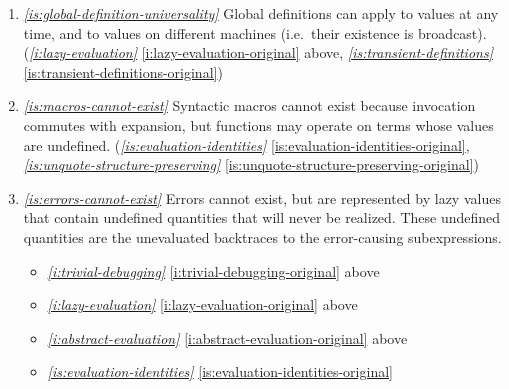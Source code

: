 \documentclass{report}
\makeatletter
\newcommand*{\Label}[2]{%
  \@bsphack
  \begingroup
    \label{#1-original}%
    \def\@currentlabel{#2}%
    \label{#1}%
  \endgroup
  \@esphack
}
\newcommand{\refboth}[1]{{\em \ref{#1}} \ref{#1-original}}
\makeatother
\begin{document}
\begin{enumerate}
\begin{itemize}
\item \refboth{i:distributed-computation} above
\item \refboth{i:no-oome} above
\item \refboth{i:lazy-evaluation} above
\item \refboth{is:runtime-as-receiver}
\end{itemize}
\item{}\Label{is:global-definition-universality}{xhs.globaldefs}{\em\ref{is:global-definition-universality}}
  Global definitions can apply to values at any time, and to values on
  different machines (i.e.~their existence is broadcast).
(\refboth{i:lazy-evaluation} above, \refboth{is:transient-definitions})

\item{}\Label{is:macros-cannot-exist}{xhs.nomacros}{\em\ref{is:macros-cannot-exist}}
  Syntactic macros cannot exist because invocation commutes with expansion,
  but functions may operate on terms whose values are undefined.
(\refboth{is:evaluation-identities}, \refboth{is:unquote-structure-preserving})
\item{}\Label{is:errors-cannot-exist}{xhs.noerrors}{\em\ref{is:errors-cannot-exist}}
  Errors cannot exist, but are represented by lazy values that contain
  undefined quantities that will never be realized. These undefined
  quantities are the unevaluated backtraces to the error-causing
  subexpressions.
\begin{itemize}
\item \refboth{i:trivial-debugging} above
\item \refboth{i:lazy-evaluation} above
\item \refboth{i:abstract-evaluation} above
\item \refboth{is:evaluation-identities}
\end{itemize}


\end{enumerate}
\end{document}
